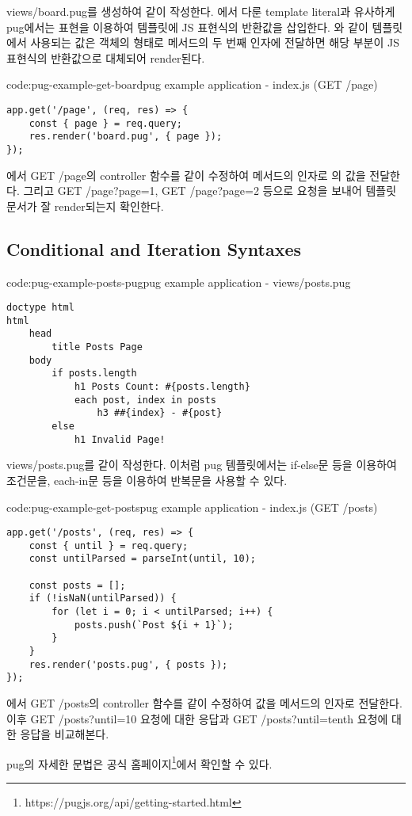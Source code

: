 views/board.pug를 생성하여 \와 같이 작성한다. 에서 다룬 template literal과 유사하게 pug에서는 \cd{\#\{\}} 표현을 이용하여 템플릿에 JS 표현식의 반환값을 삽입한다. 와 같이 템플릿에서 사용되는 값은 객체의 형태로  메서드의 두 번째 인자에 전달하면 해당 부분이 JS 표현식의 반환값으로 대체되어 render된다.

\begin{code}{code:pug-example-get-board}{pug example application - index.js (GET /page)}
\begin{verbatim}
app.get('/page', (req, res) => {
    const { page } = req.query;
    res.render('board.pug', { page });
});
\end{verbatim}
\end{code}

에서 GET /page의 controller 함수를 \와 같이 수정하여  메서드의 인자로 의 값을 전달한다. 그리고 GET /page?page=1, GET /page?page=2 등으로 요청을 보내어 템플릿 문서가 잘 render되는지 확인한다.
\clearpage

\subsection*{Conditional and Iteration Syntaxes}

\begin{code}{code:pug-example-posts-pug}{pug example application - views/posts.pug}
\begin{verbatim}
doctype html
html
    head
        title Posts Page
    body
        if posts.length
            h1 Posts Count: #{posts.length}
            each post, index in posts
                h3 ##{index} - #{post}
        else
            h1 Invalid Page!
\end{verbatim}
\end{code}

views/posts.pug를 \와 같이 작성한다. 이처럼 pug 템플릿에서는 if-else문 등을 이용하여 조건문을, each-in문 등을 이용하여 반복문을 사용할 수 있다.

\begin{code}{code:pug-example-get-posts}{pug example application - index.js (GET /posts)}
\begin{verbatim}
app.get('/posts', (req, res) => {
    const { until } = req.query;
    const untilParsed = parseInt(until, 10);

    const posts = [];
    if (!isNaN(untilParsed)) {
        for (let i = 0; i < untilParsed; i++) {
            posts.push(`Post ${i + 1}`);
        }
    }
    res.render('posts.pug', { posts });
});
\end{verbatim}
\end{code}

에서 GET /posts의 controller 함수를 \와 같이 수정하여  값을  메서드의 인자로 전달한다. 이후 GET /posts?until=10 요청에 대한 응답과 GET /posts?until=tenth 요청에 대한 응답을 비교해본다.

pug의 자세한 문법은 공식 홈페이지\footnote{https://pugjs.org/api/getting-started.html}에서 확인할 수 있다.
